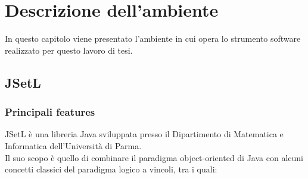 

\section{Descrizione dell'ambiente}

In questo capitolo viene presentato l'ambiente in cui opera lo strumento software realizzato per questo lavoro di tesi.
\subsection{JSetL}

\subsubsection{Principali features}
JSetL è una libreria Java sviluppata presso il Dipartimento di Matematica e Informatica dell'Università di Parma.\\
Il suo scopo è quello di combinare il paradigma object-oriented di Java con alcuni concetti classici del paradigma logico a vincoli, tra i quali:\\

